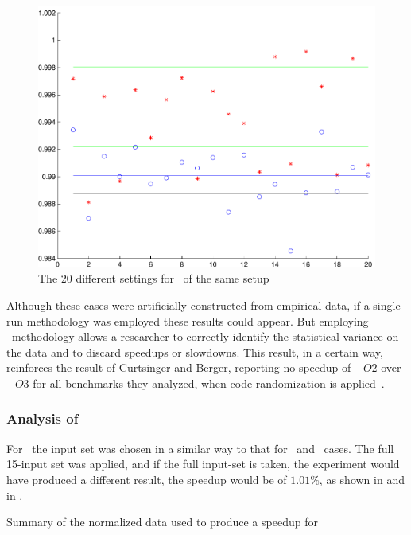 \begin{figure}
  \centering
  \includegraphics[width=1.00\linewidth]{Figures/gzipfdll}
  \caption{The $20$ different settings for \gzip\ of the same setup}
  \label{fig:gzipfdll}
\end{figure}

Although these cases were artificially constructed from empirical data, if a single-run methodology was employed these results could appear. But employing \CP\ methodology allows a researcher to correctly identify the statistical variance on the data and to discard speedups or slowdowns. This result, in a certain way, reinforces the result of Curtsinger and Berger, reporting no speedup of $-O2$ over $-O3$ for all benchmarks they analyzed, when code randomization is applied~\cite{Curtsinger2013}.


\subsubsection{Analysis of \gobmk}

For \gobmk\ the input set was chosen in a similar way to that for \bzip\ and \gzip\ cases. The full 15-input set was applied, and if the full input-set is taken, the experiment would have produced a different result, the speedup would be of $1.01 \%$, as shown in  and in .

\begin{table}
  \centering
  \begin{tiny}
  
  \end{tiny}
  \caption{Summary of the normalized data used to produce a speedup for \gcc}
  \label{tab:fullspeedupgbk}
\end{table}

